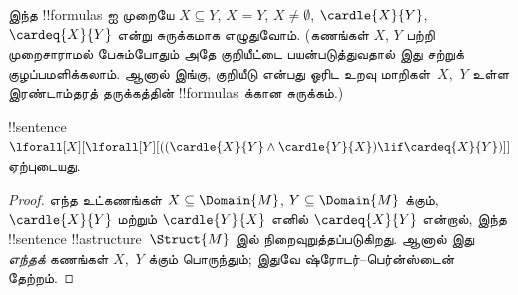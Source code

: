\documentclass[../../../include/open-logic-section]{subfiles}
\begin{document}
இந்த !!{formula}s ஐ முறையே $X \subseteq Y$, $X = Y$,
$X \neq \emptyset$, $\cardle{X}{Y}$, $\cardeq{X}{Y}$ என்று
சுருக்கமாக எழுதுவோம். (கணங்கள் $X$, $Y$ பற்றி முறைசாராமல்
பேசும்போதும் அதே குறியீட்டை பயன்படுத்துவதால் இது சற்றுக்
குழப்பமளிக்கலாம். ஆனால் இங்கு, குறியீடு என்பது ஓரிட உறவு
மாறிகள்~$X$,~$Y$ உள்ள இரண்டாம்தரத் தருக்கத்தின் !!{formula}s க்கான
சுருக்கம்.)

\begin{prop}
!!{sentence} $\lforall[X][\lforall[Y][((\cardle{X}{Y} \land
    \cardle{Y}{X}) \lif \cardeq{X}{Y})]]$ ஏற்புடையது.
\end{prop}

\begin{proof}
எந்த உட்கணங்கள் $X \subseteq \Domain{M}$,
$Y \subseteq \Domain{M}$ க்கும், $\cardle{X}{Y}$ மற்றும்
$\cardle{Y}{X}$ எனில் $\cardeq{X}{Y}$ என்றால், இந்த !!{sentence}
!!a{structure}~$\Struct{M}$ இல் நிறைவுறுத்தப்படுகிறது. ஆனால் இது
\emph{எந்தக்} கணங்கள் $X$,~$Y$ க்கும் பொருந்தும்; இதுவே
ஷ்ரோடர்--பெர்ன்ஸ்டைன் தேற்றம்.
\end{proof}
\end{document}
